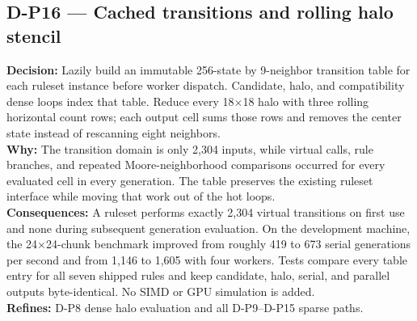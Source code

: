 \subsection*{D-P16 --- Cached transitions and rolling halo stencil}
\begin{decisionbox}[title={D-P16 \quad 2026-08-09}]
\textbf{Decision:} Lazily build an immutable 256-state by 9-neighbor transition
table for each ruleset instance before worker dispatch. Candidate, halo, and
compatibility dense loops index that table. Reduce every 18$\times$18 halo with
three rolling horizontal count rows; each output cell sums those rows and
removes the center state instead of rescanning eight neighbors.\\
\textbf{Why:} The transition domain is only 2,304 inputs, while virtual calls,
rule branches, and repeated Moore-neighborhood comparisons occurred for every
evaluated cell in every generation. The table preserves the existing ruleset
interface while moving that work out of the hot loops.\\
\textbf{Consequences:} A ruleset performs exactly 2,304 virtual transitions on
first use and none during subsequent generation evaluation. On the development
machine, the 24$\times$24-chunk benchmark improved from roughly 419 to 673
serial generations per second and from 1,146 to 1,605 with four workers. Tests
compare every table entry for all seven shipped rules and keep candidate, halo,
serial, and parallel outputs byte-identical. No SIMD or GPU simulation is added.\\
\textbf{Refines:} D-P8 dense halo evaluation and all D-P9--D-P15 sparse paths.
\end{decisionbox}

